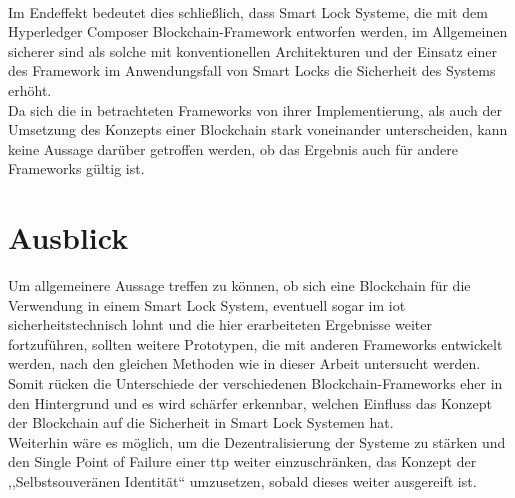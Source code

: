     \bigskip\\
    Im Endeffekt bedeutet dies schließlich, dass Smart Lock Systeme, die mit dem Hyperledger Composer Blockchain-Framework entworfen werden, im Allgemeinen sicherer sind als solche mit konventionellen Architekturen und der Einsatz einer des Framework im Anwendungsfall von Smart Locks die Sicherheit des Systems erhöht. \\
    Da sich die in  betrachteten Frameworks von ihrer Implementierung, als auch der Umsetzung des Konzepts einer Blockchain stark voneinander unterscheiden, kann keine Aussage darüber getroffen werden, ob das Ergebnis auch für andere Frameworks gültig ist.
    
\section{Ausblick}
\label{sec:end_further}
    Um allgemeinere Aussage treffen zu können, ob sich eine Blockchain für die Verwendung in einem Smart Lock System, eventuell sogar im \gls{iot} sicherheitstechnisch lohnt und die hier erarbeiteten Ergebnisse weiter fortzuführen, sollten weitere Prototypen, die mit anderen Frameworks entwickelt werden, nach den gleichen Methoden wie in dieser Arbeit untersucht werden. 
    Somit rücken die Unterschiede der verschiedenen Blockchain-Frameworks eher in den Hintergrund und es wird schärfer erkennbar, welchen Einfluss das Konzept der Blockchain auf die Sicherheit in Smart Lock Systemen hat. 
    \medskip\\
    Weiterhin wäre es möglich, um die Dezentralisierung der Systeme zu stärken und den Single Point of Failure einer \gls{ttp} weiter einzuschränken, das Konzept der ,,Selbstsouveränen Identität``\cite{Sherriff2017,W3C} umzusetzen, sobald dieses weiter ausgereift ist. 
